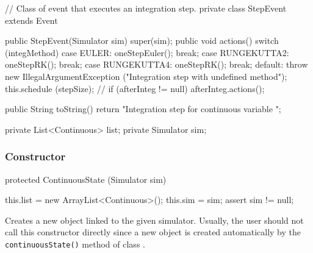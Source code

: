 \begin{code}
\begin{hide}
 // Class of event that executes an integration step.
   private class StepEvent extends Event {
      public StepEvent(Simulator sim) { super(sim); }
      public void actions() {
         switch (integMethod) {
            case EULER:       oneStepEuler();  break;
            case RUNGEKUTTA2: oneStepRK();  break;
            case RUNGEKUTTA4: oneStepRK();  break;
            default: throw new IllegalArgumentException 
                ("Integration step with undefined method");
         }
         this.schedule (stepSize);
         // if (afterInteg != null) afterInteg.actions();
      }

      public String toString() {
         return "Integration step for continuous variable ";
      }
   }

   private List<Continuous> list;
   private Simulator sim;
\end{hide}
\end{code}

\subsubsection* {Constructor}
\begin{code}
   protected ContinuousState (Simulator sim) \begin{hide} {
      this.list = new ArrayList<Continuous>();
      this.sim = sim;
      assert sim != null;
   }
\end{hide}
\end{code} 
 \begin{tabb}  Creates a new  object linked to the given simulator. 
 Usually, the user should not call this constructor directly since a new object 
 is created automatically by the \texttt{continuousState()} method of
 class .
 \end{tabb}
